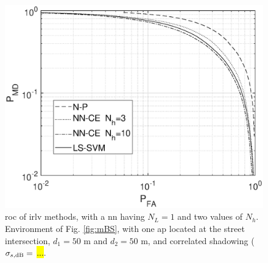 \documentclass[draftcls,onecolumn,12pt]{IEEEtran}
\begin{document}
\begin{figure}[t]
    \centering
    \includegraphics[width=0.6\columnwidth]{res_NP_approx_SVM.eps}
    \caption{\ac{roc} of \ac{irlv} methods, with a \ac{nn} having $N_L=1$ and two values of $N_h$. Environment of Fig. \ref{fig:mBS}, with one \ac{ap} located at the street intersection, $d_1 = 50$ m and $d_2 = 50$ m, and correlated shadowing ($\sigma_{s, {\rm dB}} = $ \hl{...}.}
    \label{fig:trueMap}
\end{figure}
\end{document}
